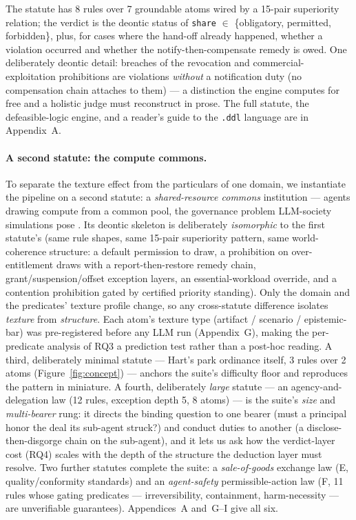 The statute has 8 rules over 7 groundable atoms wired by a 15-pair
superiority relation; the verdict is the deontic status of \texttt{share}
$\in$ \{obligatory, permitted, forbidden\}, plus, for cases where the
hand-off already happened, whether a violation occurred and whether the
notify-then-compensate remedy is owed. One deliberately deontic detail:
breaches of the revocation and commercial-exploitation prohibitions are
violations \emph{without} a notification duty (no compensation chain attaches
to them) --- a distinction the engine computes for free and a holistic judge
must reconstruct in prose. The full statute, the defeasible-logic engine, and
a reader's guide to the \texttt{.ddl} language are in Appendix~A.

\paragraph{A second statute: the compute commons.} To separate the texture
effect from the particulars of one domain, we instantiate the pipeline on a
second statute: a \emph{shared-resource commons} institution --- agents
drawing compute from a common pool, the governance problem LLM-society
simulations pose \citep{piatti2024govsim}. Its deontic skeleton is
deliberately \emph{isomorphic} to the first statute's (same rule shapes,
same 15-pair superiority pattern, same world-coherence structure: a default
permission to draw, a prohibition on over-entitlement draws with a
report-then-restore remedy chain, grant/suspension/offset exception layers,
an essential-workload override, and a contention prohibition gated by
certified priority standing). Only the domain and the predicates' texture
profile change, so any cross-statute difference isolates \emph{texture} from
\emph{structure}. Each atom's texture type (artifact / scenario /
epistemic-bar) was pre-registered before any LLM run (Appendix~G), making
the per-predicate analysis of RQ3 a prediction test rather than a post-hoc
reading. A third, deliberately minimal statute --- Hart's park ordinance
itself, 3 rules over 2 atoms (Figure~\ref{fig:concept}) --- anchors the
suite's difficulty floor and reproduces the pattern in miniature. A fourth,
deliberately \emph{large} statute --- an agency-and-delegation law (12 rules,
exception depth 5, 8 atoms) --- is the suite's \emph{size} and
\emph{multi-bearer} rung: it directs the binding question to one bearer (must
a principal honor the deal its sub-agent struck?) and conduct duties to
another (a disclose-then-disgorge chain on the sub-agent), and it lets us ask
how the verdict-layer cost (RQ4) scales with the depth of the structure the
deduction layer must resolve. Two further statutes complete the suite: a
\emph{sale-of-goods} exchange law (E, quality/conformity standards) and an
\emph{agent-safety} permissible-action law (F, 11 rules whose gating
predicates --- irreversibility, containment, harm-necessity --- are
unverifiable guarantees). Appendices~A and~G--I give all six.


